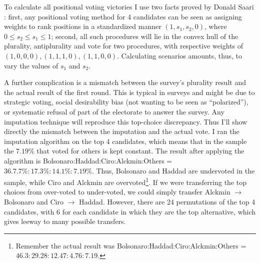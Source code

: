 \documentclass[hidelinks,11pt]{article}
\begin{document}
To calculate all positional voting victories I use two facts proved by Donald
Saari \parencite{saari2012geometry, saari2001chaotic}: first, any positional
voting method for 4 candidates can be seen as assigning weights to rank
positions in a standardized manner \((1,s_{1},s_{2},0)\), where
\(0 \leq s_{2} \leq s_{1} \leq 1\); second, all such procedures will lie in the
convex hull of the plurality, antiplurality and vote for two procedures, with
respective weights of \((1,0,0,0), (1,1,1,0), (1,1,0,0)\). Calculating scenarios
amounts, thus, to vary the values of \(s_{1}\) and \(s_{2}\).

A further complication is a mismatch between the survey's plurality result and
the actual result of the first round. This is typical in surveys and might be
due to strategic voting, social desirability bias (not wanting to be seen as
``polarized''), or systematic refusal of part of the electorate to answer the
survey. Any imputation technique will reproduce this top-choice discrepancy.
Thus I'll show directly the mismatch between the imputation and the actual
vote. I ran the imputation algorithm on the top 4
candidates, which means that in the sample the \(7.19\%\) that voted for others
is kept constant. The result after applying the algorithm is
Bolsonaro:Haddad:Ciro:Alckmin:Others = \(36.7.7\% : 17.3\% : 14.1\% :7.19\% \).
Thus, Bolsonaro and Haddad are undervoted in the sample, while Ciro and Alckmin
are overvoted\footnote{Remember the actual result was
  Bolsonaro:Haddad:Ciro:Alckmin:Others = \(46.3:29.28:12.47:4.76:7.19 \).}. If
we were transferring the top choices from over-voted to under-voted, we could
simply transfer Alckmin \(\rightarrow\) Bolsonaro and Ciro \(\rightarrow\)
Haddad. However, there are 24 permutations of the top 4 candidates, with 6 for
each candidate in which they are the top alternative, which gives leeway to many
possible transfers.
\end{document}

